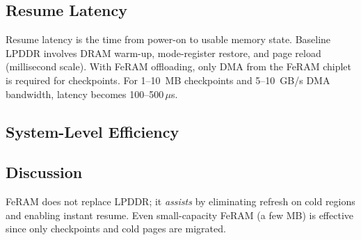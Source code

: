 \subsection{Resume Latency}
Resume latency is the time from power-on to usable memory state.
Baseline LPDDR involves DRAM warm-up, mode-register restore, and page reload (millisecond scale).
With FeRAM offloading, only DMA from the FeRAM chiplet is required for checkpoints.
For 1--10~MB checkpoints and 5--10~GB/s DMA bandwidth, latency becomes 100--500\,$\mu$s.

\subsection{System-Level Efficiency}
\begin{table}[t]
  \centering
  \caption{System-level efficiency impact of LPDDR+FeRAM integration.}
  \label{tab:sys_efficiency}
  \small
  \setlength{\tabcolsep}{4pt}
  \vspace{-1.0mm}
\end{table}

\subsection{Discussion}
FeRAM does not replace LPDDR; it \emph{assists} by eliminating refresh on cold regions and enabling instant resume.
Even small-capacity FeRAM (a few MB) is effective since only checkpoints and cold pages are migrated.
